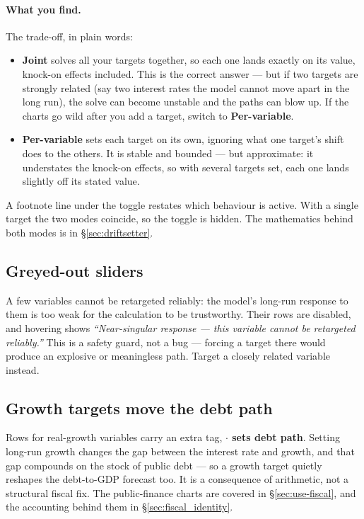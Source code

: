 \documentclass[11pt]{article}
\theoremstyle{definition}
\theoremstyle{remark}
\begin{document}
\paragraph{What you find.} The trade-off, in plain words:
\begin{itemize}
  \item \textbf{Joint} solves all your targets together, so each one lands exactly on
    its value, knock-on effects included. This is the correct answer --- but if two
    targets are strongly related (say two interest rates the model cannot move apart
    in the long run), the solve can become unstable and the paths can blow up. If the
    charts go wild after you add a target, switch to \textbf{Per-variable}.
  \item \textbf{Per-variable} sets each target on its own, ignoring what one target's
    shift does to the others. It is stable and bounded --- but approximate: it
    understates the knock-on effects, so with several targets set, each one lands
    slightly off its stated value.
\end{itemize}
A footnote line under the toggle restates which behaviour is active. With a single
target the two modes coincide, so the toggle is hidden. The mathematics behind both
modes is in \S\ref{sec:driftsetter}.

\subsection{Greyed-out sliders}

A few variables cannot be retargeted reliably: the model's long-run response to them is
too weak for the calculation to be trustworthy. Their rows are disabled, and hovering
shows \emph{``Near-singular response --- this variable cannot be retargeted
reliably.''} This is a safety guard, not a bug --- forcing a target there would produce
an explosive or meaningless path. Target a closely related variable instead.

\subsection{Growth targets move the debt path}

Rows for real-growth variables carry an extra tag, \textbf{\(\cdot\) sets debt path}.
Setting long-run growth changes the gap between the interest rate and growth, and that
gap compounds on the stock of public debt --- so a growth target quietly reshapes the
debt-to-GDP forecast too. It is a consequence of arithmetic, not a structural fiscal
fix. The public-finance charts are covered in \S\ref{sec:use-fiscal}, and the
accounting behind them in \S\ref{sec:fiscal_identity}.
\end{document}
